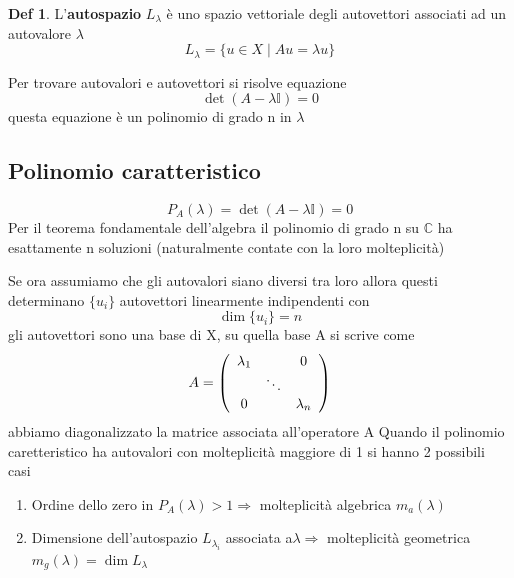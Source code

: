 \documentclass[a4paper,11pt]{report}
\theoremstyle{remark}
\theoremstyle{definition}
\newtheorem*{Def}{Def}
\newcommand{\C}{\mathbb{C}}
\begin{document}
\begin{Def}
	L'\textbf{autospazio} $L_\lambda$ è uno spazio vettoriale degli autovettori associati ad un autovalore $\lambda$
	\begin{equation*}
		L_\lambda = \{u \in X \; | \; Au=\lambda u\}
	\end{equation*}
\end{Def}

\noindent Per trovare autovalori e autovettori si risolve equazione
\begin{equation*}
	\det{(A-\lambda \mathbb{I})} =0
\end{equation*}
questa equazione è un polinomio di grado n in $\lambda$ 

\subsection*{Polinomio caratteristico}
\begin{equation*}
	P_A(\lambda) = \det{(A-\lambda\mathbb{I})} = 0
\end{equation*}
Per il teorema fondamentale dell'algebra il polinomio di grado n su $\C$ ha esattamente n soluzioni (naturalmente contate con la loro molteplicità) \newline

Se ora assumiamo che gli autovalori siano diversi tra loro allora questi determinano $\{u_i\}$ autovettori linearmente indipendenti con
\begin{equation*}
	\dim{\{u_i\}} = n
\end{equation*}
gli autovettori sono una base di X, su quella base A si scrive come
\begin{equation*}A = \left(
	\begin{array}[]{ccc}
		\lambda_1 &&  0 \\
		&\ddots  &\\
		0  &&\lambda_n
	\end{array}\right)
\end{equation*} 
abbiamo diagonalizzato la matrice associata all'operatore A \newline
Quando il polinomio caretteristico ha autovalori con molteplicità maggiore di 1 si hanno 2 possibili casi
\begin{enumerate}
	\item Ordine dello zero in $P_A(\lambda)>1 \Rightarrow$ molteplicità algebrica $m_a(\lambda)$
 \item Dimensione dell'autospazio $L_{\lambda_i}$ associata a$\lambda \Rightarrow$ molteplicità geometrica $m_g(\lambda)=\dim{L_\lambda}$
\end{enumerate}
\end{document}
